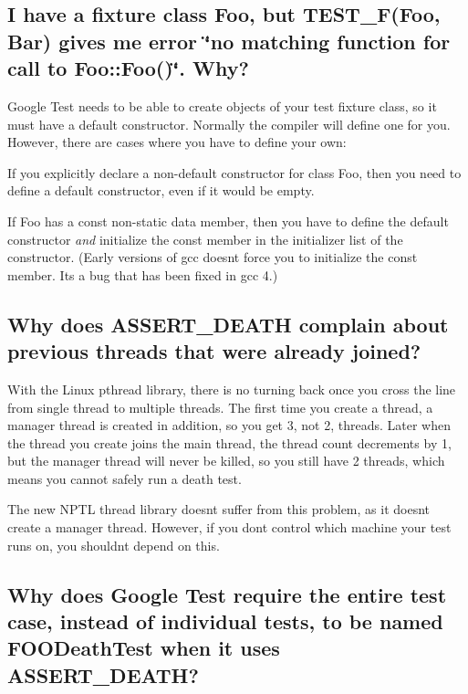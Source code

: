 \subsection*{I have a fixture class Foo, but T\+E\+S\+T\+\_\+\+F(\+Foo, Bar) gives me error \char`\"{}no matching function for call to Foo\+::\+Foo()\char`\"{}. Why?}

Google Test needs to be able to create objects of your test fixture class, so it must have a default constructor. Normally the compiler will define one for you. However, there are cases where you have to define your own\+:
\begin{DoxyItemize}
\item If you explicitly declare a non-\/default constructor for class {\ttfamily Foo}, then you need to define a default constructor, even if it would be empty.
\item If {\ttfamily Foo} has a const non-\/static data member, then you have to define the default constructor {\itshape and} initialize the const member in the initializer list of the constructor. (Early versions of {\ttfamily gcc} doesn\textquotesingle{}t force you to initialize the const member. It\textquotesingle{}s a bug that has been fixed in {\ttfamily gcc 4}.)
\end{DoxyItemize}

\subsection*{Why does A\+S\+S\+E\+R\+T\+\_\+\+D\+E\+A\+TH complain about previous threads that were already joined?}

With the Linux pthread library, there is no turning back once you cross the line from single thread to multiple threads. The first time you create a thread, a manager thread is created in addition, so you get 3, not 2, threads. Later when the thread you create joins the main thread, the thread count decrements by 1, but the manager thread will never be killed, so you still have 2 threads, which means you cannot safely run a death test.

The new N\+P\+TL thread library doesn\textquotesingle{}t suffer from this problem, as it doesn\textquotesingle{}t create a manager thread. However, if you don\textquotesingle{}t control which machine your test runs on, you shouldn\textquotesingle{}t depend on this.

\subsection*{Why does Google Test require the entire test case, instead of individual tests, to be named F\+O\+O\+Death\+Test when it uses A\+S\+S\+E\+R\+T\+\_\+\+D\+E\+A\+TH?}

